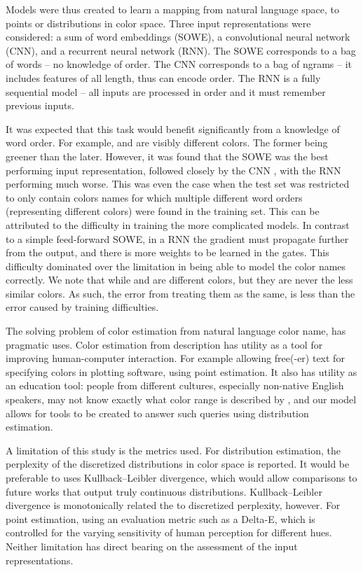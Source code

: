 \documentclass{book}
\begin{document}
Models were thus created to learn a mapping from natural language space, to points or distributions in color space.
Three input representations were considered: a sum of word embeddings (SOWE), a convolutional neural network (CNN), and a recurrent neural network (RNN).
The SOWE corresponds to a bag of words -- no knowledge of order.
The CNN corresponds to a bag of ngrams -- it includes features of all length, thus can encode order.
The RNN is a fully sequential model -- all inputs are processed in order and it must remember previous inputs.

It was expected that this task would benefit significantly from a knowledge of word order.
For example,  and  are visibly different colors.
The former being greener than the later.
However, it was found that the SOWE was the best performing input representation, 
followed closely by the CNN , with the RNN performing much worse.
This was even the case when the test set was restricted to only contain colors names for which multiple different word orders (representing different colors) were found in the training set.
This can be attributed to the difficulty in training the more complicated models.
In contrast to a simple feed-forward SOWE, in a RNN the gradient must propagate further from the output,
and there is more weights to be learned in the gates.
This difficulty dominated over the limitation in being able to model the color names correctly.
We note that while  and  are different colors, but they are never the less similar colors.
As such, the error from treating them as the same, is less than the error caused by training difficulties.


The solving problem of color estimation from natural language color name, has pragmatic uses.
Color estimation from description has utility as a tool for improving human-computer interaction.
For example allowing free(-er) text for specifying colors in plotting software, using point estimation.
It also has utility as an education tool: people from different cultures, especially non-native English speakers, may not know exactly what color range is described by , and our model allows for tools to be created to answer such queries using distribution estimation.


A limitation of this study is the metrics used.
For distribution estimation, the perplexity of the discretized distributions in color space is reported.
It would be preferable to uses Kullback–Leibler divergence, which would allow comparisons to future works that output truly continuous distributions.
Kullback–Leibler divergence is monotonically related the to discretized perplexity, however.
For point estimation, using an evaluation metric such as a Delta-E, which is controlled for the varying sensitivity of human perception for different hues.
Neither limitation has direct bearing on the assessment of the input representations.
\end{document}
